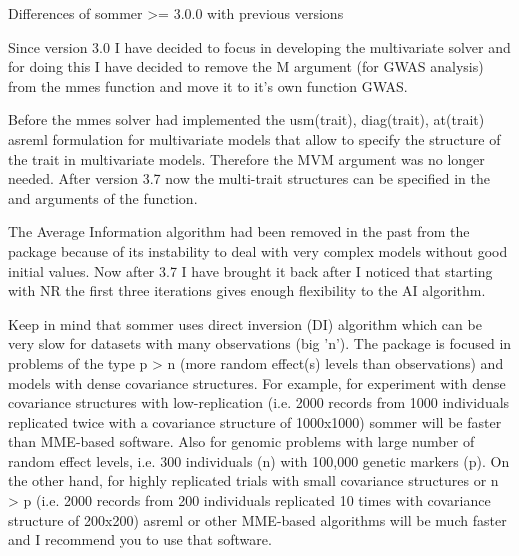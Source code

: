 \documentclass[a4paper]{book}
\begin{document}
\begin{Section}{Differences of sommer >= 3.0.0 with previous versions}

Since version 3.0 I have decided to focus in developing the multivariate solver and for doing this I have decided to remove the M argument (for GWAS analysis) from the mmes function and move it to it's own function GWAS.

Before the mmes solver had implemented the usm(trait), diag(trait), at(trait) asreml formulation for multivariate models that allow to specify the structure of the trait in multivariate models. Therefore the MVM argument was no longer needed. After version 3.7 now the multi-trait structures can be specified in the  and  arguments of the  function.

The Average Information algorithm had been removed in the past from the package because of its instability to deal with very complex models without good initial values. Now after 3.7 I have brought it back after I noticed that starting with NR the first three iterations gives enough flexibility to the AI algorithm.

Keep in mind that sommer uses direct inversion (DI) algorithm which can be very slow for datasets with many observations (big 'n'). The package is focused in problems of the type p > n (more random effect(s) levels than observations) and models with dense covariance structures. For example, for experiment with dense covariance structures with low-replication (i.e. 2000 records from 1000 individuals replicated  twice with a covariance structure of 1000x1000) sommer will be faster than MME-based software. Also for genomic problems with large number of random effect levels, i.e. 300 individuals (n) with 100,000 genetic markers (p). On the other hand, for highly replicated trials with small covariance structures or n > p (i.e. 2000 records from 200 individuals replicated 10 times with covariance structure of 200x200) asreml or other MME-based algorithms will be much faster and I recommend you to use that software.

\end{Section}
%
\end{document}
